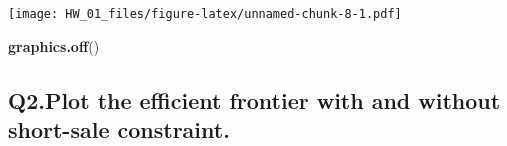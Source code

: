 \documentclass[]{article}
\newenvironment{Shaded}{\begin{snugshade}}{\end{snugshade}}
\newcommand{\KeywordTok}[1]{\textcolor[rgb]{0.13,0.29,0.53}{\textbf{#1}}}
\newcommand{\NormalTok}[1]{#1}
\begin{document}
\texttt{[image: HW\_01\_files/figure-latex/unnamed-chunk-8-1.pdf]}

\begin{Shaded}
\begin{Highlighting}[]
\KeywordTok{graphics.off}\NormalTok{()}
\end{Highlighting}
\end{Shaded}

\hypertarget{q2.plot-the-efficient-frontier-with-and-without-short-sale-constraint.}{%
\subsection{Q2.Plot the efficient frontier with and without short-sale
constraint.}\label{q2.plot-the-efficient-frontier-with-and-without-short-sale-constraint.}}
\end{document}
